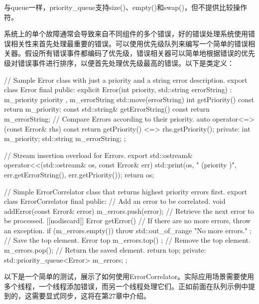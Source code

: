 与queue一样，priority\_queue支持size()、empty()和swap()，但不提供比较操作符。


系统上的单个故障通常会导致来自不同组件的多个错误，好的错误处理系统使用错误相关性来首先处理最重要的错误。可以使用优先级队列来编写一个简单的错误相关器。假设所有错误事件都编码了优先级，错误相关器可以简单地根据错误的优先级对错误事件进行排序，以便首先处理优先级最高的错误。以下是类定义：

\begin{cpp}
// Sample Error class with just a priority and a string error description.
export class Error final
{
    public:
        explicit Error(int priority, std::string errorString)
            : m_priority { priority }, m_errorString { std::move(errorString) } { }
        int getPriority() const { return m_priority; }
        const std::string& getErrorString() const { return m_errorString; }
        // Compare Errors according to their priority.
        auto operator<=>(const Error& rhs) const {
            return getPriority() <=> rhs.getPriority(); }
    private:
        int m_priority;
        std::string m_errorString;
};

// Stream insertion overload for Errors.
export std::ostream& operator<<(std::ostream& os, const Error& err)
{
    std::print(os, "{} (priority {})", err.getErrorString(), err.getPriority());
    return os;
}

// Simple ErrorCorrelator class that returns highest priority errors first.
export class ErrorCorrelator final
{
    public:
        // Add an error to be correlated.
        void addError(const Error& error) { m_errors.push(error); }
        // Retrieve the next error to be processed.
        [[nodiscard]] Error getError()
        {
            // If there are no more errors, throw an exception.
            if (m_errors.empty()) {
                throw std::out_of_range { "No more errors." };
            }
            // Save the top element.
            Error top { m_errors.top() };
            // Remove the top element.
            m_errors.pop();
            // Return the saved element.
            return top;
        }
    private:
        std::priority_queue<Error> m_errors;
};
\end{cpp}

以下是一个简单的测试，展示了如何使用ErrorCorrelator。实际应用场景需要使用多个线程，一个线程添加错误，而另一个线程处理它们。正如前面在队列示例中提到的，这需要显式同步，这将在第27章中介绍。

